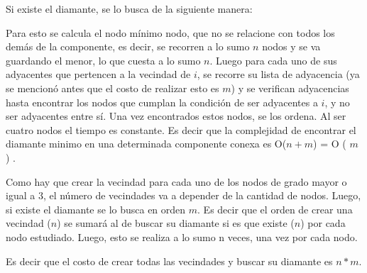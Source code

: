 \documentclass[a4paper,11pt] {article}
\begin{document}
Si existe el diamante, se lo busca de la siguiente manera:

Para esto se calcula el nodo mínimo nodo, que no se relacione con todos los demás de la componente, es decir, se recorren a lo sumo $n$ nodos y se va guardando el menor, lo que cuesta a lo sumo $n$.
Luego para cada uno de sus adyacentes que pertencen a la vecindad de $i$, se recorre su lista de adyacencia (ya se mencionó antes que el costo de realizar esto es $m$) y se verifican adyacencias hasta encontrar los nodos que cumplan la condición de ser adyacentes a $i$, y no ser adyacentes entre sí.
Una vez encontrados estos nodos, se los ordena. Al ser cuatro nodos el tiempo es constante. 
Es decir que la complejidad de encontrar el diamante minimo en una determinada componente conexa es O($n + m$) = O ( $m$ ) .

Como hay que crear la vecindad para cada uno de los nodos de grado mayor o igual a 3, el número de vecindades va a depender de la cantidad de nodos. Luego, si existe el diamante se lo busca en orden $m$.
Es decir que el orden de crear una vecindad ($n$) se sumará al de buscar su diamante si es que existe ($n$) por cada nodo estudiado. Luego, esto se realiza a lo sumo n veces, una vez por cada nodo.

Es decir que el costo de crear todas las vecindades y buscar su diamante es $n * m$. 
\end{document}
